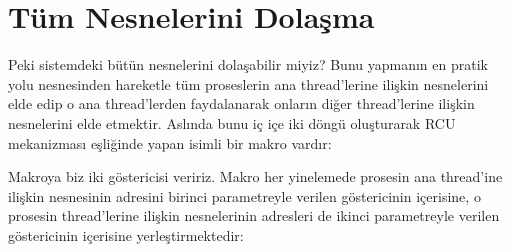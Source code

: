 \documentclass[a4paper,10pt,turkish]{sphinxmanual}
\begin{document}
\section{Tüm  Nesnelerini Dolaşma}
\label{\detokenize{processcontrolblock:tum-task-struct-nesnelerini-dolasma}}
\sphinxAtStartPar
Peki sistemdeki bütün  nesnelerini dolaşabilir miyiz? Bunu yapmanın en pratik yolu
 nesnesinden hareketle tüm proseslerin ana thread’lerine ilişkin  nesnelerini
elde edip o ana thread’lerden faydalanarak onların diğer thread’lerine ilişkin  nesnelerini
elde etmektir. Aslında bunu iç içe iki döngü oluşturarak RCU mekanizması eşliğinde yapan
 isimli bir makro vardır:

\begin{sphinxVerbatim}[commandchars=\\\{\}]

\end{sphinxVerbatim}

\sphinxAtStartPar
Makroya biz iki  göstericisi veririz. Makro her yinelemede prosesin ana thread’ine ilişkin
 nesnesinin adresini birinci parametreyle verilen göstericinin içerisine, o prosesin
thread’lerine ilişkin  nesnelerinin adresleri de ikinci parametreyle verilen göstericinin
içerisine yerleştirmektedir:
\end{document}
